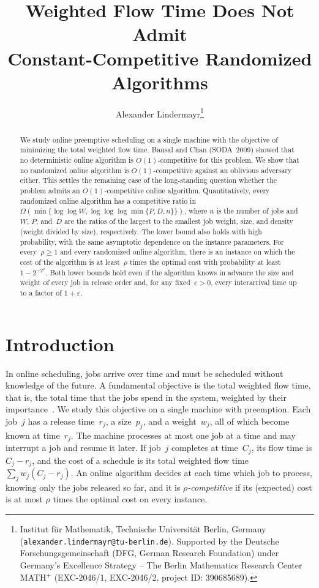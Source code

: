 \documentclass[11pt,letterpaper]{article}
\title{Weighted Flow Time Does Not Admit\\ Constant-Competitive Randomized Algorithms}
\author{Alexander Lindermayr\thanks{Institut für Mathematik, Technische Universität Berlin, Germany (\texttt{alexander.lindermayr@tu-berlin.de}). Supported by the Deutsche Forschungsgemeinschaft (DFG, German Research Foundation) under Germany’s Excellence Strategy -- The Berlin Mathematics Research Center MATH$^+$ (EXC-2046/1, EXC-2046/2, project ID: 390685689).}}
\date{}
\theoremstyle{definition}
\theoremstyle{remark}
\newcommand{\eps}{\varepsilon}
\begin{document}
\maketitle

\begin{abstract}
We study online preemptive scheduling on a single machine with the objective of minimizing the total weighted flow time. Bansal and Chan (SODA~2009) showed that no deterministic online algorithm is $O(1)$-competitive for this problem. We show that no randomized online algorithm is $O(1)$-competitive against an oblivious adversary either. This settles the remaining case of the long-standing question whether the problem admits an $O(1)$-competitive online algorithm. Quantitatively, every randomized online algorithm has a competitive ratio in~$\Omega(\min\{\log\log W,\log\log\log\min\{P,D,n\}\})$, where $n$ is the number of jobs and $W$, $P$, and~$D$ are the ratios of the largest to the smallest job weight, size, and density (weight divided by size), respectively. The lower bound also holds with high probability, with the same asymptotic dependence on the instance parameters. For every~$\rho\ge1$ and every randomized online algorithm, there is an instance on which the cost of the algorithm is at least~$\rho$ times the optimal cost with probability at least $1-2^{-2^\rho}$. Both lower bounds hold even if the algorithm knows in advance the size and weight of every job in release order and, for any fixed~$\eps>0$, every interarrival time up to a factor of $1+\eps$.
\end{abstract}

\section{Introduction}

In online scheduling, jobs arrive over time and must be scheduled without knowledge of the future. A fundamental objective is the total weighted flow time, that is, the total time that the jobs spend in the system, weighted by their importance~\cite{PruhsST04}. We study this objective on a single machine with preemption. Each job~$j$ has a release time~$r_j$, a size~$p_j$, and a weight~$w_j$, all of which become known at time~$r_j$. The machine processes at most one job at a time and may interrupt a job and resume it later. If job~$j$ completes at time~$C_j$, its flow time is $C_j-r_j$, and the cost of a schedule is its total weighted flow time $\sum_j w_j(C_j-r_j)$. An online algorithm decides at each time which job to process, knowing only the jobs released so far, and it is \emph{$\rho$-competitive} if its (expected) cost is at most $\rho$ times the optimal cost on every instance.
\end{document}
